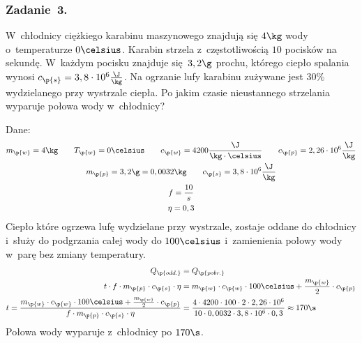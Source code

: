 \subsubsection*{Zadanie~3.}
\begin{statement}
    W~chłodnicy ciężkiego karabinu maszynowego znajdują się \(4\kg\) wody o~temperaturze \(0\celsius\). Karabin strzela z~częstotliwością \(10\) pocisków na sekundę. W~każdym pocisku znajduje się \(3,2\g\) prochu, którego ciepło spalania wynosi \(c_\p{s} = 3,8 \cdot 10^6 \frac{\J}{\kg}\). Na ogrzanie lufy karabinu zużywane jest \(30\%\) wydzielanego przy wystrzale ciepła. Po jakim czasie nieustannego strzelania wyparuje połowa wody w~chłodnicy?
\end{statement}
Dane:
\begin{gather*}
    m_\p{w} = 4\kg \qquad T_\p{w} = 0\celsius \qquad c_\p{w} = 4200\frac{\J}{\kg \cdot \celsius} \qquad c_\p{p} = 2,26 \cdot 10^6\frac{\J}{\kg}\\
    m_\p{p} = 3,2\g = 0,0032\kg \qquad c_\p{s} = 3,8 \cdot 10^6\frac{\J}{\kg}\\
    f = \frac{10}{s}\\
    \eta = 0,3\\
\end{gather*}
Ciepło które ogrzewa lufę wydzielane przy wystrzale, zostaje oddane do chłodnicy i~służy do podgrzania całej wody do \(100\celsius\) i~zamienienia połowy wody w~parę bez zmiany temperatury.
\begin{align*}
    Q_\p{odd.} &= Q_\p{pobr.}\\
    t \cdot f \cdot m_\p{p} \cdot c_\p{s} \cdot \eta &= m_\p{w} \cdot c_\p{w} \cdot 100\celsius + \frac{m_\p{w}}{2} \cdot c_\p{p}\\
    t = \frac{m_\p{w} \cdot c_\p{w} \cdot 100\celsius + \frac{m_\p{w}}{2} \cdot c_\p{p}}{f \cdot m_\p{p} \cdot c_\p{s} \cdot \eta}
        &= \frac{4 \cdot 4200 \cdot 100 \cdot 2 \cdot 2,26 \cdot 10^6}{10 \cdot 0,0032 \cdot 3,8 \cdot 10^6 \cdot 0,3}
        \approx 170\s
\end{align*}
Połowa wody wyparuje z~chłodnicy po \(170\s\).
